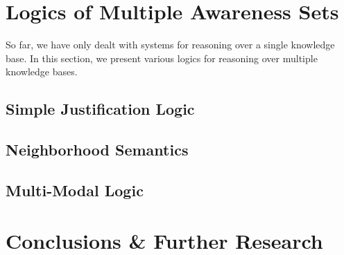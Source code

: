 \documentclass{article}
\begin{document}
\section{Logics of Multiple Awareness Sets}

So far, we have only dealt with systems for reasoning over a single knowledge
base.  In this section, we present various logics for reasoning over multiple
knowledge bases.

\subsection{Simple Justification Logic}
\label{simple_justification}


% 

\subsection{Neighborhood Semantics}
\label{neighborhood_semantics}


\subsection{\label{quantifying}Multi-Modal Logic}
\label{modal-modal}


\section{Conclusions \& Further Research}
\label{conclusions}




\end{document}
